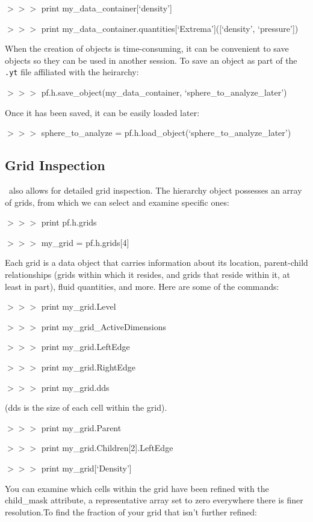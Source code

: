 {\scriptsize$>>>$} print my\_data\_container[`density']

{\scriptsize$>>>$} print my\_data\_container.quantities[`Extrema']([`density', `pressure'])

When the creation of objects is time-consuming, it can be convenient
to save objects so they can be used in another session. To save an
object as part of the {\tt .yt} file affiliated with the heirarchy:

{\scriptsize$>>>$} pf.h.save\_object(my\_data\_container, `sphere\_to\_analyze\_later')

Once it has been saved, it can be easily loaded later:

{\scriptsize$>>>$} sphere\_to\_analyze = pf.h.load\_object(`sphere\_to\_analyze\_later')

\subsection{Grid Inspection}

\yt\ also allows for detailed grid inspection. The hierarchy object
possesses an array of grids, from which we can select and examine
specific ones:

{\scriptsize$>>>$} print pf.h.grids

{\scriptsize$>>>$} my\_grid = pf.h.grids[4]

Each grid is a data object that carries information about its
location, parent-child relationships (grids within which it resides, and
grids that reside within it, at least in part), fluid quantities, and
more. Here are some of the commands:

{\scriptsize$>>>$} print my\_grid.Level

{\scriptsize$>>>$} print my\_grid\_ActiveDimensions

{\scriptsize$>>>$} print my\_grid.LeftEdge

{\scriptsize$>>>$} print my\_grid.RightEdge

{\scriptsize$>>>$} print my\_grid.dds

(dds is the size of each cell within the grid).

{\scriptsize$>>>$} print my\_grid.Parent

{\scriptsize$>>>$} print my\_grid.Children[2].LeftEdge

{\scriptsize$>>>$} print my\_grid[`Density']

You can examine which cells within the grid have been refined with the
child\_mask attribute, a representative array set to zero everywhere
there is finer resolution.To find the fraction of your grid that isn't
further refined:

